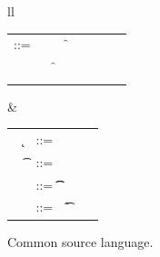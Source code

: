 \documentclass[a4paper,USenglish]{tex/lipics-v2016}
\begin{document}
\begin{figure}[!h]\hrulefill
	
	\begin{tabular}{ll}
		\begin{minipage}{6cm}\begin{tabular}{@{}l@{~}l@{}l@{}l@{}l@{}l@{}l@{}l}
				\e\hspace{.1cm} ::= & \hspace{.2cm} \x        
				&\B \this         
				&\B \FRead\f \\    
				&
				&\B \FWrite\f\e
				&\B \Call\e\m\e \\
				& 
				&\B \that      
				&\B \New\C{\e[1]..}  
		\end{tabular}\end{minipage}&
		\begin{minipage}{5cm}\begin{tabular}{l@{~}l@{}l@{}l}
				~ \k &::= \Class \C {\fd[1]..}{\md[1]..} \\
				~ \t&::= ~ \any  \B   \C  \\ 
				\md &::= \Mdef\m\x\t\t\e \\
				~\fd&::= ~ \Fdef\f\t \\ 
		\end{tabular}\end{minipage} 
	\end{tabular}
	\vspace{2mm} 

\hrulefill

        \caption{Common source language.}\label{f:sourcesyntax}
\end{figure}
\end{document}
